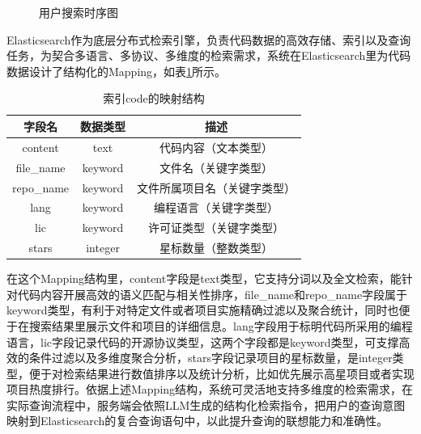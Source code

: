 \documentclass[UTF8,a4paper,12pt]{ctexart}
\numberwithin{equation}{section}
\begin{document}
\begin{figure}[H]
	\caption{用户搜索时序图}
	\label{timeline}
\end{figure}
Elasticsearch作为底层分布式检索引擎，负责代码数据的高效存储、索引以及查询任务，为契合多语言、多协议、多维度的检索需求，系统在Elasticsearch里为代码数据设计了结构化的Mapping，如表\ref{esmapping}所示。
\begin{table}[H]
	\centering
	\caption{索引code的映射结构}
	\label{tab:code_mapping}
	\small
	\begin{tabular}{c c c}
		\toprule
		字段名 & 数据类型 & 描述 \\
		\midrule
		content & text & 代码内容（文本类型） \\
		file\_name & keyword & 文件名（关键字类型） \\
		repo\_name & keyword & 文件所属项目名（关键字类型）\\
		lang & keyword & 编程语言（关键字类型） \\
		lic & keyword & 许可证类型（关键字类型） \\
		stars & integer & 星标数量（整数类型） \\
		\bottomrule
	\end{tabular}
	\label{esmapping}
\end{table}
在这个Mapping结构里，content字段是text类型，它支持分词以及全文检索，能针对代码内容开展高效的语义匹配与相关性排序，file\_name和repo\_name字段属于keyword类型，有利于对特定文件或者项目实施精确过滤以及聚合统计，同时也便于在搜索结果里展示文件和项目的详细信息。lang字段用于标明代码所采用的编程语言，lic字段记录代码的开源协议类型，这两个字段都是keyword类型，可支撑高效的条件过滤以及多维度聚合分析，stars字段记录项目的星标数量，是integer类型，便于对检索结果进行数值排序以及统计分析，比如优先展示高星项目或者实现项目热度排行。依据上述Mapping结构，系统可灵活地支持多维度的检索需求，在实际查询流程中，服务端会依照LLM生成的结构化检索指令，把用户的查询意图映射到Elasticsearch的复合查询语句中，以此提升查询的联想能力和准确性。\par
\end{document}
